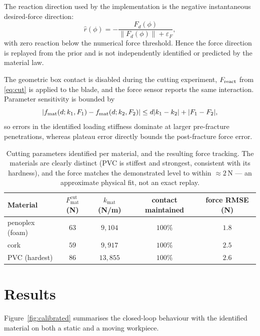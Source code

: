 \documentclass[11pt,a4paper]{article}
\newcommand{\norm}[1]{\left\lVert#1\right\rVert}
\begin{document}
The reaction direction used by the implementation is the negative
instantaneous desired-force direction:
\begin{equation}
\hat r(\phi)=-\frac{F_d(\phi)}{\norm{F_d(\phi)}+\varepsilon_F},
\label{eq:direction_identification}
\end{equation}
with zero reaction below the numerical force threshold. Hence the force
direction is replayed from the prior and is not independently identified or
predicted by the material law.

The geometric box contact is disabled during the cutting experiment,
$F_{\rm react}$ from \eqref{eq:cut} is applied to the blade, and the force
sensor reports the same interaction. Parameter sensitivity is bounded by
\begin{equation}
\left|f_{\rm mat}(d;k_1,F_1)-f_{\rm mat}(d;k_2,F_2)\right|
\le d|k_1-k_2|+|F_1-F_2|,
\label{eq:material_sensitivity}
\end{equation}
so errors in the identified loading stiffness dominate at larger pre-fracture
penetrations, whereas plateau error directly bounds the post-fracture force
error.

\begin{table}[h]
\centering
\begin{tabular}{lcccc}
\toprule
Material & $F^{\text{cut}}_{\text{mat}}$ (N) & $k_{\text{mat}}$ (N/m) & contact maintained & force RMSE (N)\\
\midrule
penoplex (foam) & $63$ & $9{,}104$ & $100\%$ & $1.8$ \\
cork & $59$ & $9{,}917$ & $100\%$ & $2.5$ \\
PVC (hardest) & $86$ & $13{,}855$ & $100\%$ & $2.6$ \\
\bottomrule
\end{tabular}
\caption{Cutting parameters identified per material, and the resulting force
tracking. The materials are clearly distinct (PVC is stiffest and strongest,
consistent with its hardness), and the force matches the demonstrated level to
within $\approx2$\,N --- an approximate physical fit, not an exact replay.}
\label{tab:material}
\end{table}

\section{Results}
\label{sec:results}
Figure~\ref{fig:calibrated} summarises the closed-loop behaviour with the
identified material on both a static and a moving workpiece.
\end{document}
